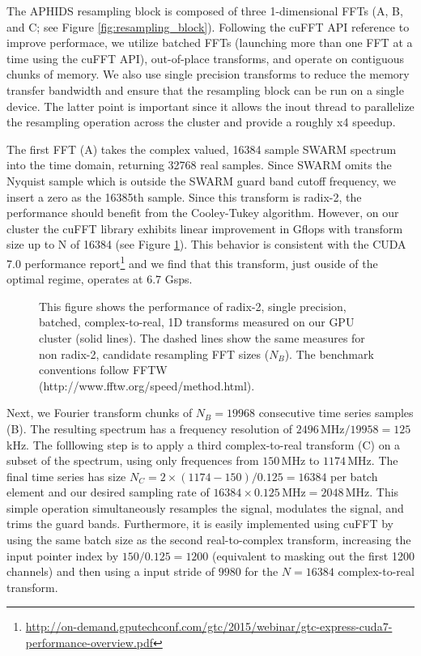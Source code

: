 The APHIDS resampling block is composed of three 1-dimensional FFTs (A, B, and C; see Figure 
\ref{fig:resampling_block}).  Following the cuFFT API reference to improve performace, we utilize batched
FFTs (launching more than one FFT at a time using the cuFFT API), out-of-place transforms, 
and operate on contiguous chunks of memory.  We also use single precision transforms to 
reduce the memory transfer bandwidth and ensure that 
the resampling block can be run on a single device.  The latter point is important since it allows the inout
thread to parallelize the resampling operation across the cluster and provide a roughly x4 speedup.


The first FFT (A) takes the complex valued, 16384 sample SWARM spectrum into the time domain, returning 
32768 real samples.  Since SWARM omits the Nyquist sample which is outside the SWARM guard band cutoff frequency, 
we insert a zero as the 16385th sample.  Since this transform is radix-2, the performance should benefit from 
the Cooley-Tukey algorithm.  However, on our cluster the cuFFT library exhibits linear improvement in Gflops 
with transform size up to N of 16384 (see Figure \ref{fig:C2R_performance}).  This behavior is consistent with 
the CUDA 7.0 performance 
report\footnote{\url{http://on-demand.gputechconf.com/gtc/2015/webinar/gtc-express-cuda7-performance-overview.pdf}} 
and we find that this transform, just ouside of the optimal regime, operates at 6.7 Gsps.

\begin{figure}[t!]
\caption{This figure shows the performance of radix-2, single precision, batched, complex-to-real, 1D transforms 
measured on our GPU cluster (solid lines). The dashed lines show the same measures for non radix-2, candidate 
resampling FFT sizes ($N_B$).  The benchmark conventions follow FFTW  (http://www.fftw.org/speed/method.html).}
\label{fig:C2R_performance}
\end{figure}

Next, we Fourier transform chunks of $N_B = 19968$ consecutive time series samples (B).  The resulting 
spectrum has a frequency resolution of $2496$\,MHz$/19958=125$\,kHz.  The folllowing step is to apply a third
complex-to-real transform (C) on a subset of the spectrum, using only frequences from $150$\,MHz to $1174$\,MHz.  
The final time series has size $N_C= 2\times(1174-150)/0.125=16384$ per batch element and our desired 
sampling rate of 
$16384 \times 0.125$\,MHz$ = 2048$\,MHz.  This simple operation simultaneously resamples the signal, modulates 
the signal, and trims the guard bands.  Furthermore, it is easily implemented using cuFFT by using the same 
batch size as the second real-to-complex transform, increasing the input pointer index by $150 / 0.125 = 1200$
(equivalent to masking out the first 1200 channels) and then using a input stride of $9980$ for the 
$N=16384$ complex-to-real transform.

